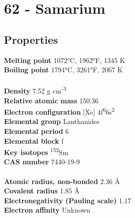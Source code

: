 \section{62 - Samarium}
\label{sec:elem-samarium}
\subsection{Properties}
\textbf{Melting point} 1072°C, 1962°F, 1345 K\\
\textbf{Boiling point} 1794°C, 3261°F, 2067 K\\
\\
\textbf{Density} 7.52 g cm\textsuperscript{-3}\\
\textbf{Relative atomic mass} 150.36\\
\textbf{Electron configuration} [Xe] 4f\textsuperscript{6}6s\textsuperscript{2}\\
\textbf{Elemental group} Lanthanides\\
\textbf{Elemental period} 6\\
\textbf{Elemental block} f\\
\textbf{Key isotopes} \textsuperscript{152}Sm\\
\textbf{CAS number} 7440-19-9\\
\\
\textbf{Atomic radius, non-bonded} 2.36 Å\\
\textbf{Covalent radius} 1.85 Å\\
\textbf{Electronegativity (Pauling scale)} 1.17\\
\textbf{Electron affinity} Unknown\\